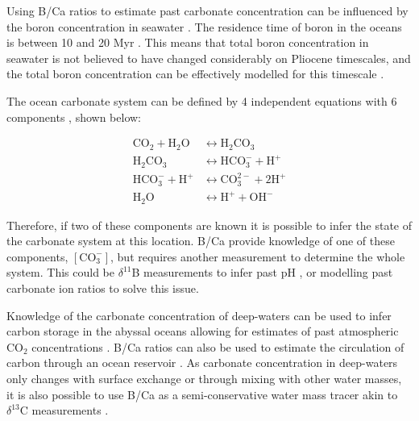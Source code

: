 Using B/Ca ratios to estimate past carbonate concentration can be influenced by the boron concentration in seawater \citep{uchikawaInfluenceSolutionChemistry2017,uchikawaExperimentalEvidenceKinetic2015}. The residence time of boron in the oceans is between 10 and 20 Myr \citep{crumpton-banksBoronIsotopesProvide2020}. This means that total boron concentration in seawater is not believed to have changed considerably on Pliocene timescales, and the total boron concentration can be effectively modelled for this timescale \citep{lemarchandInfluenceRiversMarine2000, lemarchandBoronIsotopeSystematics2002}.


The ocean carbonate system can be defined by 4 independent equations with 6 components \citep{irvingCARBONICACIDCARBONATEEQUILIBRIUM1925}, shown below:

\begin{align}
	\text{CO}_2 + \text{H}_2\text{O} &\leftrightarrow \text{H}_2\text{CO}_3 \\
	\text{H}_2\text{CO}_3 &\leftrightarrow \text{HCO}_3^- + \text{H}^+ \\
	\text{HCO}_3^- + \text{H}^+ &\leftrightarrow \text{CO}^{2-}_{3} + 2 \text{H}^{+} \\
	\text{H}_2\text{O} &\leftrightarrow \text{H}^+ + \text{OH}^-
\end{align}

Therefore, if two of these components are known it is possible to infer the state of the carbonate system at this location. B/Ca provide knowledge of one of these components, $\left[ \text{CO}_{3}^{-} \right]$, but requires another measurement to determine the whole system. This could be $\delta^{11}$B measurements to infer past pH \citep{fosterSeawaterPHPCO22008}, or modelling past carbonate ion ratios \citep{tripatiCouplingCO2Ice2009} to solve this issue.

Knowledge of the carbonate concentration of deep-waters can be used to infer carbon storage in the abyssal oceans allowing for estimates of past atmospheric CO$_2$ concentrations \citep{tripatiCouplingCO2Ice2009, chalkDynamicStorageGlacial2019}. B/Ca ratios can also be used to estimate the circulation of carbon through an ocean reservoir \citep{yuSeawaterCarbonateIond13C2008, yuDeepOceanCarbonate2014}. As carbonate concentration in deep-waters only changes with surface exchange or through mixing with other water masses, it is also possible to use B/Ca as a semi-conservative water mass tracer akin to $\delta^{13}$C measurements \citep{chalkDynamicStorageGlacial2019}.

